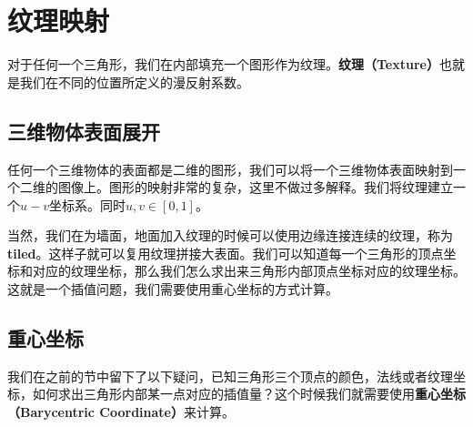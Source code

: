 \documentclass[openany]{progbookcn}
\begin{document}
\chapter{纹理映射}

对于任何一个三角形，我们在内部填充一个图形作为纹理。\textbf{纹理（Texture）}也就是我们在不同的位置所定义的漫反射系数。

\section{三维物体表面展开}

任何一个三维物体的表面都是二维的图形，我们可以将一个三维物体表面映射到一个二维的图像上。图形的映射非常的复杂，这里不做过多解释。我们将纹理建立一个$u-v$坐标系。同时$u,v\in[0,1]$。

当然，我们在为墙面，地面加入纹理的时候可以使用边缘连接连续的纹理，称为\textbf{tiled}。这样子就可以复用纹理拼接大表面。我们可以知道每一个三角形的顶点坐标和对应的纹理坐标，那么我们怎么求出来三角形内部顶点坐标对应的纹理坐标。这就是一个插值问题，我们需要使用重心坐标的方式计算。

\section{重心坐标}
我们在之前的节中留下了以下疑问，已知三角形三个顶点的颜色，法线或者纹理坐标，如何求出三角形内部某一点对应的插值量？这个时候我们就需要使用\textbf{重心坐标（Barycentric Coordinate）}来计算。
\end{document}
